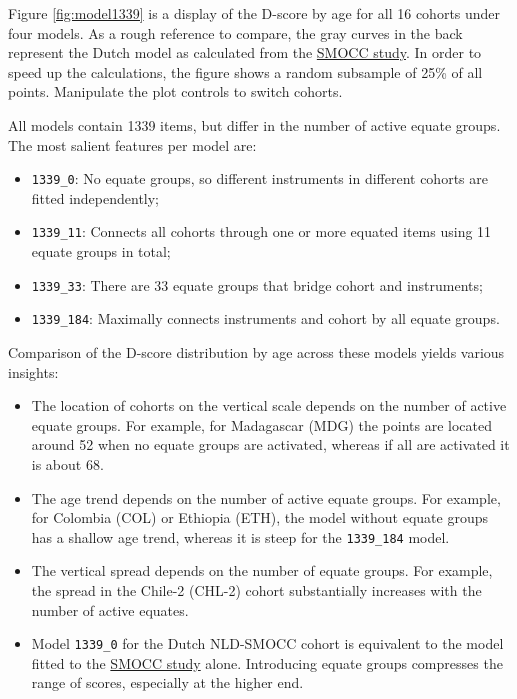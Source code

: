 \documentclass[
]{book}
\providecommand{\tightlist}{%
  \setlength{\itemsep}{0pt}\setlength{\parskip}{0pt}}
\begin{document}
Figure \ref{fig:model1339} is a display of the D-score by age for all 16 cohorts under four models. As a rough reference to compare, the gray curves in the back represent the Dutch model as calculated from the \href{https://d-score.org/dbook1/sec-smoccstudy.html}{SMOCC study}. In order to speed up the calculations, the figure shows a random subsample of 25\% of all points. Manipulate the plot controls to switch cohorts.

All models contain 1339 items, but differ in the number of active equate groups. The most salient features per model are:

\begin{itemize}
\tightlist
\item
  \texttt{1339\_0}: No equate groups, so different instruments in different cohorts are fitted independently;
\item
  \texttt{1339\_11}: Connects all cohorts through one or more equated items using 11 equate groups in total;
\item
  \texttt{1339\_33}: There are 33 equate groups that bridge cohort and instruments;
\item
  \texttt{1339\_184}: Maximally connects instruments and cohort by all equate groups.
\end{itemize}

Comparison of the D-score distribution by age across these models yields various insights:

\begin{itemize}
\item
  The location of cohorts on the vertical scale depends on the number of active equate groups. For example, for Madagascar (MDG) the points are located around 52 when no equate groups are activated, whereas if all are activated it is about 68.
\item
  The age trend depends on the number of active equate groups. For example, for Colombia (COL) or Ethiopia (ETH), the model without equate groups has a shallow age trend, whereas it is steep for the \texttt{1339\_184} model.
\item
  The vertical spread depends on the number of equate groups. For example, the spread in the Chile-2 (CHL-2) cohort substantially increases with the number of active equates.
\item
  Model \texttt{1339\_0} for the Dutch NLD-SMOCC cohort is equivalent to the model fitted to the \href{https://d-score.org/dbook1/sec-smoccstudy.html}{SMOCC study} alone. Introducing equate groups compresses the range of scores, especially at the higher end.
\end{itemize}
\end{document}
